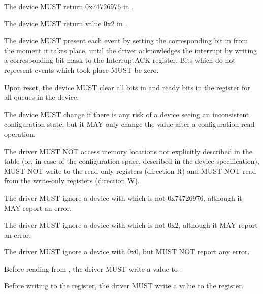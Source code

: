 
The device MUST return 0x74726976 in .

The device MUST return value 0x2 in .

The device MUST present each event by setting the corresponding bit in  from the
moment it takes place, until the driver acknowledges the interrupt
by writing a corresponding bit mask to the InterruptACK register.  Bits which
do not represent events which took place MUST be zero.

Upon reset, the device MUST clear all bits in  and ready bits in the
 register for all queues in the device.

The device MUST change  if there is any risk of a
device seeing an inconsistent configuration state, but it MAY only change the value
after a configuration read operation.

The driver MUST NOT access memory locations not explicitly described in the
table (or, in case of the configuration space, described in the device specification),
MUST NOT write to the read-only registers (direction R) and
MUST NOT read from the write-only registers (direction W).

The driver MUST ignore a device with  which is not 0x74726976,
although it MAY report an error.

The driver MUST ignore a device with  which is not 0x2,
although it MAY report an error.

The driver MUST ignore a device with  0x0,
but MUST NOT report any error.

Before reading from , the driver MUST write a value to .

Before writing to the  register, the driver MUST write a value to the  register.

